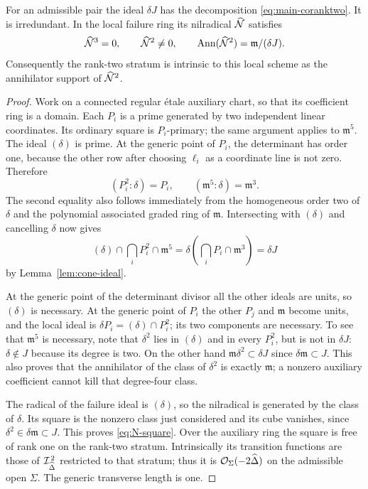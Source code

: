 \begin{theorem}\label{thm:coranktwo-proof}
For an admissible pair the ideal $\delta J$ has the decomposition
\eqref{eq:main-coranktwo}. It is irredundant. In the local failure
ring its nilradical $\widehat{\mathcal N}$ satisfies
\begin{equation}\label{eq:N-square}
 \widehat{\mathcal N}^3=0,\qquad
 \widehat{\mathcal N}^2\ne0,\qquad
 \operatorname{Ann}(\widehat{\mathcal N}^2)=\mathfrak m/(\delta J).
\end{equation}
Consequently the rank-two stratum is intrinsic to this local scheme
as the annihilator support of $\widehat{\mathcal N}^2$.
\end{theorem}
\begin{proof}
Work on a connected regular \'etale auxiliary chart, so that its
coefficient ring is a domain. Each $P_i$ is a prime generated by two
independent linear coordinates. Its ordinary square is $P_i$-primary;
the same argument applies to $\mathfrak m^5$. The ideal $(\delta)$
is prime. At the generic point of $P_i$, the determinant has order
one, because the other row after choosing $\ell_i$ as a coordinate
line is not zero. Therefore
\[
 (P_i^2:\delta)=P_i,
 \qquad (\mathfrak m^5:\delta)=\mathfrak m^3.
\]
The second equality also follows immediately from the homogeneous
order two of $\delta$ and the polynomial associated graded ring of
$\mathfrak m$. Intersecting with $(\delta)$ and cancelling $\delta$
now gives
\[
 (\delta)\cap\bigcap_iP_i^2\cap\mathfrak m^5
 =\delta\left(\bigcap_iP_i\cap\mathfrak m^3\right)
 =\delta J
\]
by Lemma~\ref{lem:cone-ideal}.

At the generic point of the determinant divisor all the other ideals
are units, so $(\delta)$ is necessary. At the generic point of $P_i$
the other $P_j$ and $\mathfrak m$ become units, and the local ideal
is $\delta P_i=(\delta)\cap P_i^2$; its two components are necessary.
To see that $\mathfrak m^5$ is necessary, note that $\delta^2$ lies
in $(\delta)$ and in every $P_i^2$, but is not in $\delta J$:
$\delta\notin J$ because its degree is two. On the other hand
$\mathfrak m\delta^2\subset\delta J$ since
$\delta\mathfrak m\subset J$. This also proves that the annihilator
of the class of $\delta^2$ is exactly $\mathfrak m$; a nonzero
auxiliary coefficient cannot kill that degree-four class.

The radical of the failure ideal is $(\delta)$, so the nilradical is
generated by the class of $\delta$. Its square is the nonzero class
just considered and its cube vanishes, since
$\delta^2\in\delta\mathfrak m\subset J$. This proves
\eqref{eq:N-square}. Over the auxiliary ring the square is free of
rank one on the rank-two stratum. Intrinsically its transition functions
are those of $\mathcal I_{\widehat\Delta}^{\,2}$ restricted to that stratum;
thus it is $\mathcal O_{\Sigma}(-2\widehat\Delta)$ on the admissible open
$\Sigma$. The generic transverse length is one.
\end{proof}

